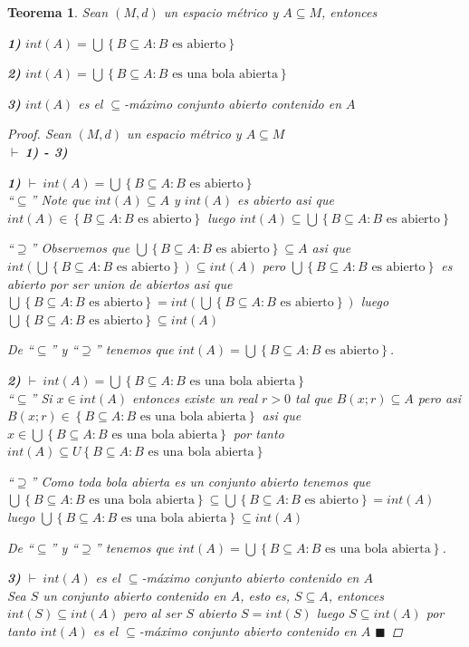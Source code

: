 \documentclass[oneside]{book} %
\theoremstyle{Teorema}
\newtheorem{Teorema}[Definicion]{Teorema}
\theoremstyle{Ejemplos}
\theoremstyle{[Obs]}
\renewcommand{\{}{\left\lbrace} %
\renewcommand{\}}{\right\rbrace} %
\newcommand{\U}{\bigcup} %
\renewcommand{\sc}{\subseteq} %
\renewcommand{\qed}{$\blacksquare$} %
\newcommand{\pd}{$\vdash\ $} %
\begin{document}
			\begin{Teorema}\setlength{\parindent}{0em}
				
				Sean $(M, d)$ un espacio métrico y $A \sc M$, entonces
				
				\textbf{1)} $int(A) = \U\{ B \sc A : B \text{ es abierto} \}$

				\textbf{2)} $int(A) = \U\{ B \sc A : B \text{ es una bola abierta} \}$

				\textbf{3)} $int(A)$ es el $\sc$-máximo conjunto abierto contenido en $A$

				\begin{proof}
					
					Sean $(M, d)$ un espacio métrico y $A \sc M$ \\
					\pd \textbf{1) - 3)} 

					\textbf{1)} \pd $int(A) = \U\{ B \sc A : B \text{ es abierto} \}$ \\
					``$\sc$'' Note que $int(A) \sc A$ y $int(A)$ es abierto asi que $int(A) \in \{ B \sc A : B \text{ es abierto} \}$ luego $int(A) \sc \U\{ B \sc A : B \text{ es abierto} \}$
					
					``$\supseteq$'' Observemos que $\U\{ B \sc A : B \text{ es abierto} \} \sc A$ asi que $int(\U\{ B \sc A : B \text{ es abierto} \}) \sc int(A)$ pero $\U\{ B \sc A : B \text{ es abierto} \}$ es abierto por ser union de abiertos asi que $\U\{ B \sc A : B \text{ es abierto} \} = int(\U\{ B \sc A : B \text{ es abierto} \})$ luego $\U\{ B \sc A : B \text{ es abierto} \} \sc int(A)$
					
					De ``$\sc$'' y ``$\supseteq$'' tenemos que $int(A) = \U\{ B \sc A : B \text{ es abierto} \}$.

					\textbf{2)} \pd $int(A) = \U\{ B \sc A : B \text{ es una bola abierta} \}$ \\ 
					``$\sc$'' Si $x \in int(A)$ entonces existe un real $r > 0$ tal que $B(x;r) \sc A$ pero asi $B(x;r) \in \{ B \sc A : B \text{ es una} \right.$ $\left. \text{bola abierta} \}$ asi que $x \in \U\{ B \sc A : B \text{ es una bola abierta} \}$ por tanto $int(A) \sc U\{ B \sc A : B \text{ es una} \right.$ $\left. \text{bola abierta} \}$
					
					``$\supseteq$'' Como toda bola abierta es un conjunto abierto tenemos que $\U\{ B \sc A : B \text{ es una bola abierta} \} \sc \U\{ B \sc A : B \text{ es abierto} \} = int(A)$ luego $\U\{ B \sc A : B \text{ es una bola abierta} \} \sc int(A)$
					
					De ``$\sc$'' y ``$\supseteq$'' tenemos que $int(A) = \U\{ B \sc A : B \text{ es una bola abierta} \}$.

					\textbf{3)} \pd $int(A)$ es el $\sc$-máximo conjunto abierto contenido en $A$ \\ 
					Sea $S$ un conjunto abierto contenido en $A$, esto es, $S \sc A$, entonces $int(S) \sc int(A)$ pero al ser $S$ abierto $S = int(S)$ luego $S \sc int(A)$ por tanto $int(A)$ es el $\sc$-máximo conjunto abierto contenido en $A$ \qed

				\end{proof}

			\end{Teorema}
\end{document}
